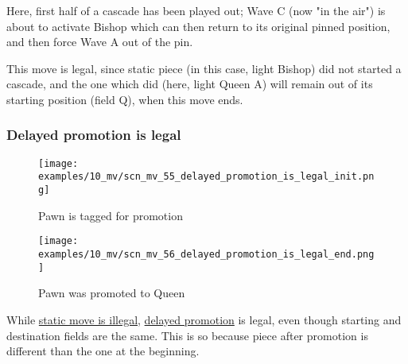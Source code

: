 \vspace*{-0.4\baselineskip}
Here, first half of a cascade has been played out; Wave C (now "in the air") is
about to activate Bishop which can then return to its original pinned position,
and then force Wave A out of the pin.

This move is legal, since static piece (in this case, light Bishop) did not started
a cascade, and the one which did (here, light Queen A) will remain out of its
starting position (field Q), when this move ends.

\clearpage %

\subsubsection*{Delayed promotion is legal}
\label{sec:Miranda's veil/Wave/Cascading Waves/Delayed promotion is legal}

\noindent
\begin{figure}[!h]
\texttt{[image: examples/10\_mv/scn\_mv\_55\_delayed\_promotion\_is\_legal\_init.png]}
\caption{Pawn is tagged for promotion}
\label{fig:scn_mv_55_delayed_promotion_is_legal_init}
\end{figure}

\noindent
\begin{figure}[!h]
\texttt{[image: examples/10\_mv/scn\_mv\_56\_delayed\_promotion\_is\_legal\_end.png]}
\caption{Pawn was promoted to Queen}
\label{fig:scn_mv_56_delayed_promotion_is_legal_end}
\end{figure}

While \hyperref[fig:scn_mv_51_static_move_is_illegal_init]{static move is illegal},
\hyperref[sec:Age of Aquarius/Promotion]{delayed promotion} is legal, even though
starting and destination fields are the same. This is so because piece after
promotion is different than the one at the beginning.

\clearpage %

